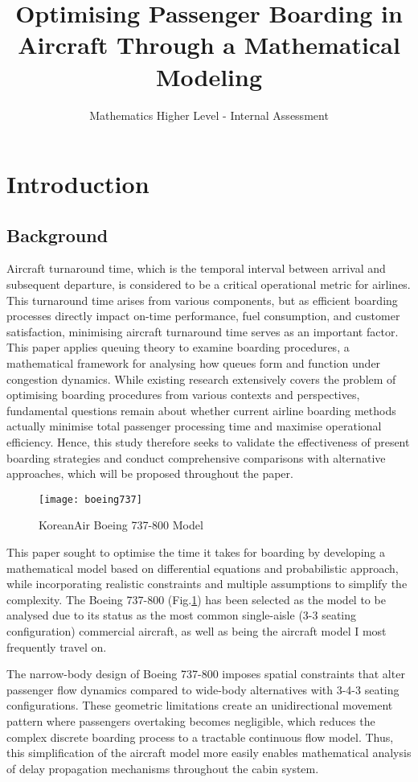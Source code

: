 \documentclass[12pt]{article}
\title{Optimising Passenger Boarding in Aircraft Through a Mathematical Modeling}
\author{Mathematics Higher Level - Internal Assessment}
\date{}
\begin{document}
\maketitle

\section{Introduction}
\subsection{Background}

Aircraft turnaround time, which is the temporal interval between arrival and subsequent departure, is considered to be a critical operational metric for airlines. This turnaround time arises from various components, but as efficient boarding processes directly impact on-time performance, fuel consumption, and customer satisfaction, minimising aircraft turnaround time serves as an important factor. This paper applies queuing theory to examine boarding procedures, a mathematical framework for analysing how queues form and function under congestion dynamics. While existing research extensively covers the problem of optimising boarding procedures from various contexts and perspectives, fundamental questions remain about whether current airline boarding methods actually minimise total passenger processing time and maximise operational efficiency. Hence, this study therefore seeks to validate the effectiveness of present boarding strategies and conduct comprehensive comparisons with alternative approaches, which will be proposed throughout the paper.

\begin{figure}[h]
    \centering
    \texttt{[image: boeing737]}
    \caption{KoreanAir Boeing 737-800 Model}
    \label{fig:boeing737}
\end{figure}

This paper sought to optimise the time it takes for boarding by developing a mathematical model based on differential equations and probabilistic approach, while incorporating realistic constraints and multiple assumptions to simplify the complexity. The Boeing 737-800 (Fig.\ref{fig:boeing737}) has been selected as the model to be analysed due to its status as the most common single-aisle (3-3 seating configuration) commercial aircraft, as well as being the aircraft model I most frequently travel on.

The narrow-body design of Boeing 737-800 imposes spatial constraints that alter passenger flow dynamics compared to wide-body alternatives with 3-4-3 seating configurations. These geometric limitations create an unidirectional movement pattern where passengers overtaking becomes negligible, which reduces the complex discrete boarding process to a tractable continuous flow model. Thus, this simplification of the aircraft model more easily enables mathematical analysis of delay propagation mechanisms throughout the cabin system.
\end{document}
